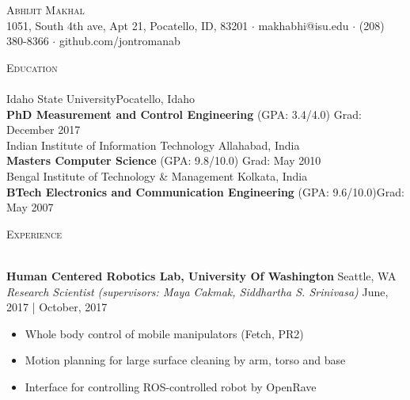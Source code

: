 \documentclass[a4paper]{article}
\newcommand{\lineunder} {
    \vspace*{-8pt} \\
    \hspace*{-18pt} \hrulefill \\
}
\newcommand{\header} [1] {
    {\hspace*{-18pt}\vspace*{6pt} \textsc{#1}}
    \vspace*{-6pt} \lineunder
}
\begin{document}
\vspace*{-40pt}

\vspace*{-10pt}
\begin{center}
	{\Huge \scshape {Abhijit Makhal}}\\
	1051, South 4th ave, Apt 21, Pocatello, ID, 83201 $\cdot$ makhabhi@isu.edu $\cdot$ (208) 380-8366 $\cdot$ github.com/jontromanab\\
\end{center}

\vspace*{2mm}

\header{Education}
Idaho State University\hfill Pocatello, Idaho\\
\textbf{PhD Measurement and Control Engineering} (GPA: 3.4/4.0) \hfill Grad: December 2017\\
\vspace{2mm}
Indian Institute of Information Technology \hfill Allahabad, India\\
\textbf{Masters Computer Science} (GPA: 9.8/10.0) \hfill Grad: May 2010\\
\vspace{2mm}
Bengal Institute of Technology \& Management \hfill Kolkata, India\\
\textbf{BTech Electronics and Communication Engineering} (GPA: 9.6/10.0)\hfill Grad: May 2007\\
\vspace{2mm}

\vspace*{2mm}

\header{Experience}
\vspace{1mm}

\textbf{Human Centered Robotics Lab, University Of Washington} \hfill Seattle, WA\\
\textit{Research Scientist (supervisors: Maya Cakmak, Siddhartha S. Srinivasa)}
\hfill  June, 2017 | October, 2017\\
\vspace{-1mm}
\begin{itemize} \itemsep 1pt
	\item Whole body control of mobile manipulators (Fetch, PR2)
	\item Motion planning for large surface cleaning by arm, torso and base
	\item Interface for controlling ROS-controlled robot by OpenRave
\end{itemize}
\end{document}
